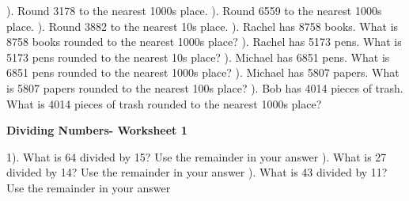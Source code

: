 \documentclass{article}%
\begin{document}
). Round 3178 to the nearest 1000s place.%
\newline%
\newline%
). Round 6559 to the nearest 1000s place.%
\newline%
\newline%
). Round 3882 to the nearest 10s place.%
\newline%
\newline%
). Rachel has 8758 books. What is 8758 books rounded to the nearest 1000s place?%
\newline%
\newline%
). Rachel has 5173 pens. What is 5173 pens rounded to the nearest 10s place?%
\newline%
\newline%
). Michael has 6851 pens. What is 6851 pens rounded to the nearest 1000s place?%
\newline%
\newline%
). Michael has 5807 papers. What is 5807 papers rounded to the nearest 100s place?%
\newline%
\newline%
). Bob has 4014 pieces of trash. What is 4014 pieces of trash rounded to the nearest 1000s place?%
\newline%
\newline%
\newline%
\pagebreak%
\large%
\begin{center}%
\textbf{Dividing Numbers- Worksheet 1}%
\newline%
\newline%
\newline%
\end{center} \normalsize%
1). What is 64 divided by 15? Use the remainder in your answer%
\newline%
\newline%
). What is 27 divided by 14? Use the remainder in your answer%
\newline%
\newline%
). What is 43 divided by 11? Use the remainder in your answer%
\end{document}
